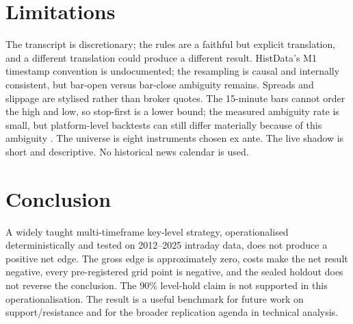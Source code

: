 \documentclass[11pt,a4paper]{article}
\begin{document}
\section{Limitations}
The transcript is discretionary; the rules are a faithful but explicit translation, and a different translation could produce a different result. HistData's M1 timestamp convention is undocumented; the resampling is causal and internally consistent, but bar-open versus bar-close ambiguity remains. Spreads and slippage are stylised rather than broker quotes. The 15-minute bars cannot order the high and low, so stop-first is a lower bound; the measured ambiguity rate is small, but platform-level backtests can still differ materially because of this ambiguity \citep{claeys2026backtests}. The universe is eight instruments chosen ex ante. The live shadow is short and descriptive. No historical news calendar is used.
\section{Conclusion}
A widely taught multi-timeframe key-level strategy, operationalised deterministically and tested on 2012--2025 intraday data, does not produce a positive net edge. The gross edge is approximately zero, costs make the net result negative, every pre-registered grid point is negative, and the sealed holdout does not reverse the conclusion. The 90\% level-hold claim is not supported in this operationalisation. The result is a useful benchmark for future work on support/resistance and for the broader replication agenda in technical analysis.


\end{document}
